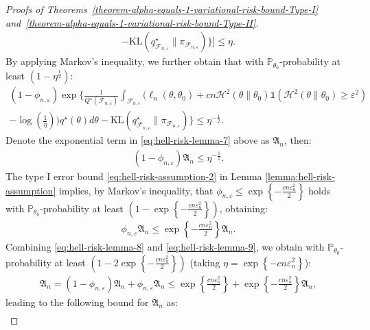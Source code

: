 \documentclass[12pt]{article}
\numberwithin{equation}{section}
\begin{document}
\begin{proof}[Proofs of Theorems~\ref{theorem-alpha-equals-1-variational-risk-bound-Type-I} and~\ref{theorem-alpha-equals-1-variational-risk-bound-Type-II}]
\begin{multline}
    -\mathrm{KL}(q^{\star}_{\mathcal{F}_{n, \varepsilon}}\parallel \pi_{\mathcal{F}_{n, \varepsilon}})\Bigg\}\Bigg] \leq \eta.
\end{multline}
By applying Markov's inequality, we further obtain that with $\mathbb{P}_{\theta_0}$-probability at least $(1 - \eta^{\tfrac{1}{2}})$:
\begin{multline}\label{eq:hell-risk-lemma-7}
    (1-\phi_{n, \varepsilon}) \exp\Bigg\{\frac{1}{Q^{\star}(\mathcal{F}_{n, \varepsilon})}\int_{\mathcal{F}_{n, \varepsilon}}\Bigg(\ell_n(\theta, \theta_0) + c n \mathcal{H}^{2}(\theta \parallel \theta_0) \mathds{1}(\mathcal{H}^{2}(\theta\parallel \theta_0) \geq \varepsilon^2)\\
    -\log\left(\frac{1}{\eta}\right)\Bigg)q^{\star}(\theta)d\theta - \mathrm{KL}(q^{\star}_{\mathcal{F}_{n, \varepsilon}}\parallel \pi_{\mathcal{F}_{n, \varepsilon}})\Bigg\} \leq \eta^{-\tfrac{1}{2}}.
\end{multline}
Denote the exponential term in \eqref{eq:hell-risk-lemma-7} above as $\mathfrak{A}_n$, then:
\begin{align}\label{eq:hell-risk-lemma-8}
    (1-\phi_{n, \varepsilon})\mathfrak{A}_n \leq \eta^{-\tfrac{1}{2}}.
\end{align}
The type I error bound \eqref{eq:hell-risk-assumption-2} in Lemma \ref{lemma:hell-risk-assumption} implies, by Markov's inequality, that $\phi_{n, \varepsilon} \leq \exp\left\{-\tfrac{c n \varepsilon_n^2}{2}\right\}$ holds with $\mathbb{P}_{\theta_0}$-probability at least $\left(1 - \exp\left\{-\tfrac{c n \varepsilon_n^2}{2}\right\}\right)$, obtaining:
\begin{align}\label{eq:hell-risk-lemma-9}
    \phi_{n, \varepsilon}\mathfrak{A}_n \leq \exp\left\{-\frac{c n \varepsilon_n^2}{2}\right\}\mathfrak{A}_n.
\end{align}
Combining \eqref{eq:hell-risk-lemma-8} and \eqref{eq:hell-risk-lemma-9}, we obtain with $\mathbb{P}_{\theta_0}$-probability at least $\left(1 - 2\exp\left\{-\tfrac{c n \varepsilon_n^{2}}{2}\right\}\right)$ (taking $\eta = \exp\left\{-c n \varepsilon_n^2\right\}$):
\begin{align}\label{eq:hell-risk-lemma-10}
    \mathfrak{A}_n = (1 - \phi_{n, \varepsilon})\mathfrak{A}_n + \phi_{n, \varepsilon}\mathfrak{A}_n \leq \exp\left\{\frac{c n \varepsilon_n^2}{2}\right\} + \exp\left\{-\frac{c n \varepsilon_n^2}{2}\right\}\mathfrak{A}_n,
\end{align}
leading to the following bound for $\mathfrak{A}_n$ as:
\begin{align}\label{eq:hell-risk-lemma-11}

\end{align}
\end{proof}
\end{document}
